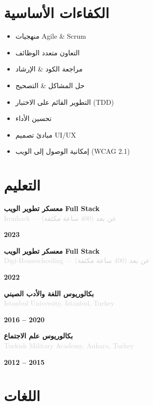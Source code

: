 \documentclass[10pt,a4paper]{article}
\newcommand{\Education}[3]{%
  \vspace{2pt}
  \noindent
  \begin{minipage}[t]{0.70\textwidth}
    {\normalsize\textbf{\color{darkgray}#1}} \\
    \textcolor{lightgray}{\small #2}
  \end{minipage}%
  \hfill
  \begin{minipage}[t]{0.28\textwidth}
    \raggedleft
    \textcolor{mediumgray}{\small\textbf{#3}}
  \end{minipage}
  \vspace{1pt}
}
\begin{document}
\section*{الكفاءات الأساسية}

\noindent
\begin{minipage}[t]{0.48\textwidth}
  \begin{itemize}
    \item منهجيات Agile \& Scrum
    \item التعاون متعدد الوظائف
    \item مراجعة الكود \& الإرشاد
    \item حل المشاكل \& التصحيح
  \end{itemize}
\end{minipage}%
\hfill
\begin{minipage}[t]{0.48\textwidth}
  \begin{itemize}
    \item التطوير القائم على الاختبار (TDD)
    \item تحسين الأداء
    \item مبادئ تصميم UI/UX
    \item إمكانية الوصول إلى الويب (WCAG 2.1)
  \end{itemize}
\end{minipage}

\section*{التعليم}

\Education{معسكر تطوير الويب Full Stack}{Ironhack — عن بعد (400 ساعة مكثفة)}{2023}

\Education{معسكر تطوير الويب Full Stack}{Digi-Homeschooling — عن بعد (400 ساعة مكثفة)}{2022}

\Education{بكالوريوس اللغة والأدب الصيني}{Istanbul University, Istanbul, Turkey}{2016 -- 2020}

\Education{بكالوريوس علم الاجتماع}{Turkish Military Academy, Ankara, Turkey}{2012 -- 2015}

\section*{اللغات}
\end{document}
